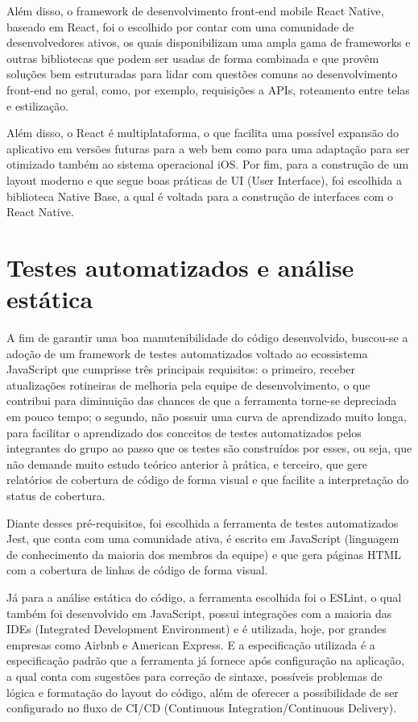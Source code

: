 Além disso, o framework de desenvolvimento front-end mobile React Native, baseado em React, foi o escolhido por contar com uma comunidade de desenvolvedores ativos, os quais disponibilizam uma ampla gama de frameworks e outras bibliotecas que podem ser usadas de forma combinada e que provêm soluções bem estruturadas para lidar com questões comuns ao desenvolvimento front-end no geral, como, por exemplo, requisições a APIs, roteamento entre telas e estilização.

Além disso, o React é multiplataforma, o que facilita uma possível expansão do aplicativo em versões futuras para a web bem como para uma adaptação para ser otimizado também ao sistema operacional iOS.
Por fim, para a construção de um layout moderno e que segue boas práticas de UI (User Interface), foi escolhida a biblioteca Native Base, a qual é voltada para a construção de interfaces com o React Native.

\section{Testes automatizados e análise estática}
A fim de garantir uma boa manutenibilidade do código desenvolvido, buscou-se a adoção de um framework de testes automatizados voltado ao ecossistema JavaScript que cumprisse três principais requisitos: o primeiro, receber atualizações rotineiras de melhoria pela equipe de desenvolvimento, o que contribui para  diminuição das chances de que a ferramenta torne-se depreciada em pouco tempo; o segundo, não possuir uma curva de aprendizado muito longa, para facilitar o aprendizado dos conceitos de testes automatizados pelos integrantes do grupo ao passo que os testes são construídos por esses, ou seja, que não demande muito estudo teórico anterior à prática, e terceiro, que gere relatórios de cobertura de código de forma visual e que facilite a interpretação do status de cobertura. 

Diante desses pré-requisitos, foi escolhida a ferramenta de testes automatizados Jest, que conta com uma comunidade ativa, é escrito em JavaScript (linguagem de conhecimento da maioria dos membros da equipe) e que gera páginas HTML com a cobertura de linhas de código de forma visual. 

Já para a análise estática do código, a ferramenta escolhida foi o ESLint, o qual também foi desenvolvido em JavaScript, possui integrações com a maioria das IDEs (Integrated Development Environment) e é utilizada, hoje, por grandes empresas como Airbnb e American Express. E a especificação utilizada é a especificação padrão que a ferramenta já fornece após configuração na aplicação, a qual conta com sugestões para correção de sintaxe, possíveis problemas de lógica e formatação do layout do código, além de oferecer a possibilidade de ser configurado no fluxo de CI/CD (Continuous Integration/Continuous Delivery). 


